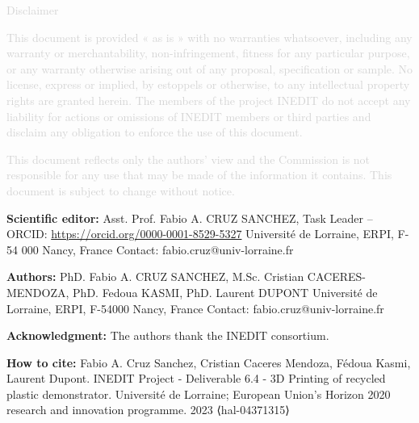 \documentclass[
  11pt,
]{article}
\begin{document}
\vfill

\begin{center}
\textcolor{lightgray}{Disclaimer}

\textcolor{lightgray}{
\small
This document is provided « as is » with no warranties whatsoever, including any warranty or merchantability, non-infringement, fitness for any particular purpose, or any warranty otherwise arising out of any proposal, specification or sample.  No license, express or implied, by estoppels or otherwise, to any intellectual property rights are granted herein. The members of the project INEDIT do not accept any liability for actions or omissions of INEDIT members or third parties and disclaim any obligation to enforce the use of this document. }

\textcolor{lightgray}{
This document reflects only the authors' view and the Commission is not responsible for any use that may be made of the information it contains.  This document is subject to change without notice. 
}
\end{center}
\normalsize


\newpage

\vfill



\textbf{Scientific editor:} \newline
Asst. Prof. Fabio A. CRUZ SANCHEZ, Task Leader – ORCID: \href{https://orcid.org/0000-0001-8529-5327}{https://orcid.org/0000-0001-8529-5327} \newline
Université de Lorraine, ERPI, F-54 000 Nancy, France \newline
Contact: fabio.cruz@univ-lorraine.fr 

\vspace{2cm}

\textbf{Authors:} \newline
PhD. Fabio A. CRUZ SANCHEZ, M.Sc. Cristian CACERES-MENDOZA, PhD. Fedoua KASMI, PhD. Laurent DUPONT \newline
Université de Lorraine, ERPI, F-54000 Nancy, France \newline
Contact: fabio.cruz@univ-lorraine.fr 

\vspace{2cm}

\textbf{Acknowledgment:}\newline
The authors thank the INEDIT consortium.

\vspace{2cm}

\textbf{How to cite:} \newline
Fabio A. Cruz Sanchez, Cristian Caceres Mendoza, Fédoua Kasmi, Laurent Dupont. 
INEDIT Project - Deliverable 6.4 - 3D Printing of recycled plastic demonstrator. 
Université de Lorraine; European Union’s Horizon 2020 research and innovation programme. 2023 ⟨hal-04371315⟩
\end{document}
